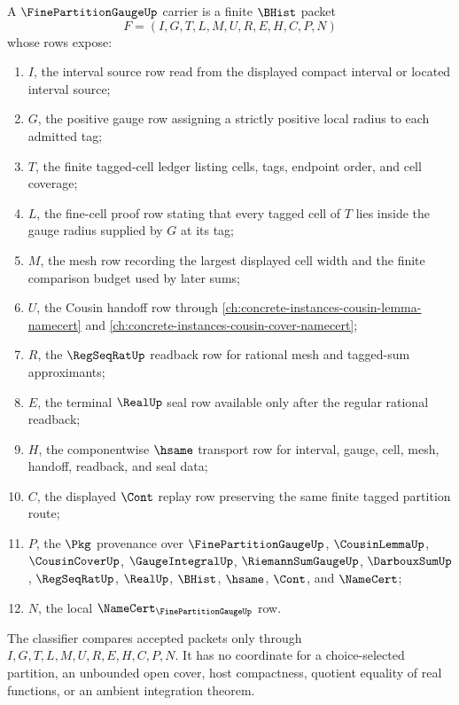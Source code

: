 \begin{definition}
\label{def:fine-partition-gauge-carrier}
A $\FinePartitionGaugeUp$ carrier is a finite $\BHist$ packet
$$
F=(I,G,T,L,M,U,R,E,H,C,P,N)
$$
whose rows expose:
\begin{enumerate}
\item $I$, the interval source row read from the displayed compact interval or located interval source;
\item $G$, the positive gauge row assigning a strictly positive local radius to each admitted tag;
\item $T$, the finite tagged-cell ledger listing cells, tags, endpoint order, and cell coverage;
\item $L$, the fine-cell proof row stating that every tagged cell of $T$ lies inside the gauge radius supplied by $G$ at its tag;
\item $M$, the mesh row recording the largest displayed cell width and the finite comparison budget used by later sums;
\item $U$, the Cousin handoff row through \autoref{ch:concrete-instances-cousin-lemma-namecert} and \autoref{ch:concrete-instances-cousin-cover-namecert};
\item $R$, the $\RegSeqRatUp$ readback row for rational mesh and tagged-sum approximants;
\item $E$, the terminal $\RealUp$ seal row available only after the regular rational readback;
\item $H$, the componentwise $\hsame$ transport row for interval, gauge, cell, mesh, handoff, readback, and seal data;
\item $C$, the displayed $\Cont$ replay row preserving the same finite tagged partition route;
\item $P$, the $\Pkg$ provenance over $\FinePartitionGaugeUp$, $\CousinLemmaUp$, $\CousinCoverUp$, $\GaugeIntegralUp$, $\RiemannSumGaugeUp$, $\DarbouxSumUp$, $\RegSeqRatUp$, $\RealUp$, $\BHist$, $\hsame$, $\Cont$, and $\NameCert$;
\item $N$, the local $\NameCert_{\FinePartitionGaugeUp}$ row.
\end{enumerate}
The classifier compares accepted packets only through $I,G,T,L,M,U,R,E,H,C,P,N$. It has no coordinate for a choice-selected partition, an unbounded open cover, host compactness, quotient equality of real functions, or an ambient integration theorem.
\end{definition}

